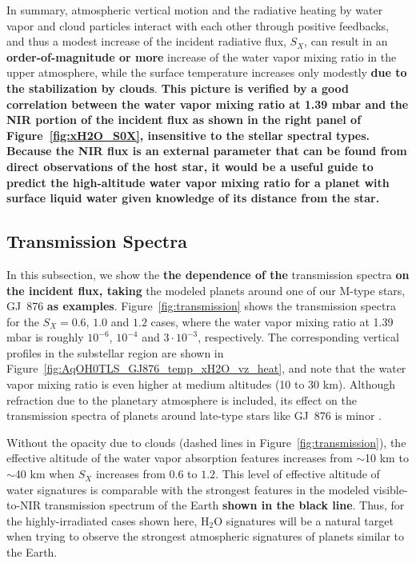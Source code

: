 \documentclass[11pt,numberedappendix,twocolappendix,]{emulateapj}
\def\water{H$_2$O}
\def\preslevel{1.39 mbar}
\def\wv{water vapor}
\def\revise#1{{\bf #1}}
\begin{document}
In summary, atmospheric vertical motion and the radiative heating by \wv{} and cloud particles interact with each other through positive feedbacks, and thus a modest increase of the incident radiative flux, $S_X$, can result in  an \revise{order-of-magnitude or more} increase of the \wv{} mixing ratio in the upper atmosphere, while the surface temperature increases only modestly \revise{due to the stabilization by clouds}. 
\revise{This picture is verified by a good correlation between the \wv{} mixing ratio at \preslevel{} and the NIR portion of the incident flux as shown in the right panel of Figure~\ref{fig:xH2O_S0X}, insensitive to the stellar spectral types. %
Because the NIR flux is an external parameter that can be found from direct observations of the host star, it would be a useful guide to predict the high-altitude \wv{}  mixing ratio for a planet with surface liquid water given knowledge of its distance from the star. }


\subsection{Transmission Spectra}
\label{ss:result_TransmissionSpectra}

In this subsection, we show the \revise{the dependence of the} transmission spectra \revise{on the incident flux, taking} the modeled planets around one of our M-type stars, GJ~876 \revise{as examples}. 
Figure~\ref{fig:transmission} shows the transmission spectra for the $S_X=0.6$, $1.0$ and $1.2$ cases, where the \wv{} mixing ratio at \preslevel{} is roughly $10^{-6}$, $10^{-4}$ and $3\cdot 10^{-3}$, respectively. 
The corresponding vertical profiles in the substellar region are shown in Figure~\ref{fig:AqOH0TLS_GJ876_temp_xH2O_vz_heat}, and note that the \wv{} mixing ratio is even higher at medium altitudes (10 to 30 km).
Although refraction due to the planetary atmosphere is included, its effect on the transmission spectra of planets around late-type stars like GJ~876 is minor \citep{Betremieux2014,Misra2014}. 

Without the opacity due to clouds (dashed lines in Figure~\ref{fig:transmission}), the effective altitude of the water vapor absorption features increases from $\sim $10 km to $\sim $40 km when $S_X$ increases from $0.6$ to $1.2$. 
This level of effective altitude of water signatures is comparable with the strongest features in the modeled visible-to-NIR transmission spectrum of the Earth \revise{shown in the black line}. 
Thus, for the highly-irradiated cases shown here, \water{} signatures will be a natural target when trying to observe the strongest atmospheric signatures of planets similar to the Earth. 
\end{document}
